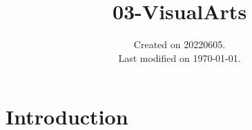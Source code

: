 \documentclass[UTF8]{../RepresentationUniverse}
\begin{document}
\title{03-VisualArts}
\date{Created on 20220605.\\   Last modified on \today.}
\maketitle
\tableofcontents


\chapter{Introduction}
\end{document}
